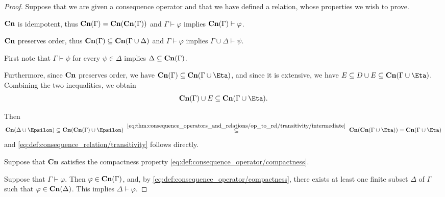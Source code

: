 \begin{proof}
   Suppose that we are given a consequence operator and that we have defined a relation, whose properties we wish to prove.

   \( \op*{Cn} \) is idempotent, thus \( \op*{Cn}(\Gamma) = \op*{Cn}(\op*{Cn}(\Gamma)) \) and \( \Gamma \vdash \varphi \) implies \( \op*{Cn}(\Gamma) \vdash \varphi \).

   \( \op*{Cn} \) preserves order, thus \( \op*{Cn}(\Gamma) \subseteq \op*{Cn}(\Gamma \cup \Delta) \) and \( \Gamma \vdash \varphi \) implies \( \Gamma \cup \Delta \vdash \psi \).

   First note that \( \Gamma \vdash \psi \) for every \( \psi \in \Delta \) implies \( \Delta \subseteq \op*{Cn}(\Gamma) \).

  Furthermore, since \( \op*{Cn} \) preserves order, we have \( \op*{Cn}(\Gamma) \subseteq \op*{Cn}(\Gamma \cup \Eta) \), and since it is extensive, we have \( E \subseteq D \cup E \subseteq \op*{Cn}(\Gamma \cup \Eta) \). Combining the two inequalities, we obtain
  \begin{equation}\label{eq:thm:consequence_operators_and_relations/op_to_rel/transitivity/intermediate}
    \op*{Cn}(\Gamma) \cup E \subseteq \op*{Cn}(\Gamma \cup \Eta).
  \end{equation}

  Then
  \begin{equation*}
    \op*{Cn}(\Delta \cup \Epsilon)
    \subseteq
    \op*{Cn}(\op*{Cn}(\Gamma) \cup \Epsilon)
    \reloset {\eqref{eq:thm:consequence_operators_and_relations/op_to_rel/transitivity/intermediate}} \subseteq
    \op*{Cn}(\op*{Cn}(\Gamma \cup \Eta))
    =
    \op*{Cn}(\Gamma \cup \Eta)
  \end{equation*}
  and \eqref{eq:def:consequence_relation/transitivity} follows directly.

   Suppose that \( \op*{Cn} \) satisfies the compactness property \eqref{eq:def:consequence_operator/compactness}.

  Suppose that \( \Gamma \vdash \varphi \). Then \( \varphi \in \op*{Cn}(\Gamma) \), and, by \eqref{eq:def:consequence_operator/compactness}, there exists at least one finite subset \( \Delta \) of \( \Gamma \) such that \( \varphi \in \op*{Cn}(\Delta) \). This implies \( \Delta \vdash \varphi \).


\end{proof}
